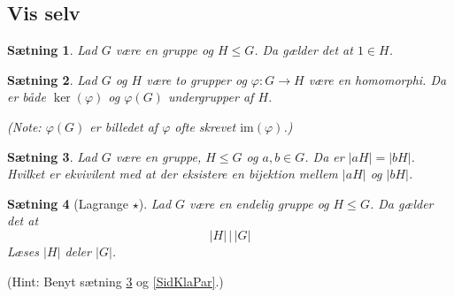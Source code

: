 \documentclass{article}
\newcommand{\too}{\rightarrow}
\newtheorem{setn}{Sætning}
\begin{document}
		\subsection*{Vis selv}
		\begin{setn}
			Lad $G$ være en gruppe og $H \le G$. Da gælder det at $1 \in H$.
		\end{setn}
		\begin{setn}
			Lad $G$ og $H$ være to grupper og $\varphi: G \too H$ være en homomorphi.
			Da er både $\ker(\varphi)$ og $\varphi(G)$ undergrupper af $H$.
			
			(Note: $\varphi(G)$ er billedet af $\varphi$ ofte skrevet $\text{im}(\varphi)$.)
		\end{setn}
		\begin{setn} \label{SidKlaStø}
			Lad $G$ være en gruppe, $H \le G$ og $a,b \in G$. Da er $|aH| = |bH|$.
			Hvilket er ekvivilent med at der eksistere en bijektion mellem $|aH|$ og $|bH|$.
		\end{setn}
		\begin{setn}[Lagrange $\star$] \label{Lagrange}
			Lad $G$ være en endelig gruppe og $H \le G$. Da gælder det at
			$$|H| \,\Big|\, |G|$$
			Læses $|H|$ deler $|G|$.
		\end{setn}
		(Hint: Benyt sætning \ref{SidKlaStø} og \ref{SidKlaPar}.)
\end{document}
